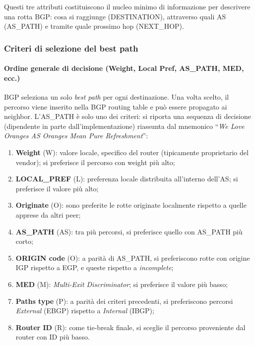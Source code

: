 Questi tre attributi costituiscono il nucleo minimo di informazione per descrivere una rotta BGP: cosa si raggiunge (DESTINATION), attraverso quali AS (AS\_PATH) e tramite quale prossimo hop (NEXT\_HOP).

\subsubsection{Criteri di selezione del best path}

\paragraph{Ordine generale di decisione (Weight, Local Pref, AS\_PATH, MED, ecc.)}

BGP seleziona un solo \emph{best path} per ogni destinazione. Una volta scelto, il percorso viene inserito nella BGP routing table e può essere propagato ai neighbor. L’AS\_PATH è solo uno dei criteri: si riporta una sequenza di decisione (dipendente in parte dall’implementazione) riassunta dal mnemonico “\emph{We Love Oranges AS Oranges Mean Pure Refreshment}”:
\begin{enumerate}
    \item \textbf{Weight} (W): valore locale, specifico del router (tipicamente proprietario del vendor); si preferisce il percorso con weight più alto;
    \item \textbf{LOCAL\_PREF} (L): preferenza locale distribuita all’interno dell’AS; si preferisce il valore più alto;
    \item \textbf{Originate} (O): sono preferite le rotte originate localmente rispetto a quelle apprese da altri peer;
    \item \textbf{AS\_PATH} (AS): tra più percorsi, si preferisce quello con AS\_PATH più corto;
    \item \textbf{ORIGIN code} (O): a parità di AS\_PATH, si preferiscono rotte con origine IGP rispetto a EGP, e queste rispetto a \emph{incomplete};
    \item \textbf{MED} (M): \emph{Multi-Exit Discriminator}; si preferisce il valore più basso;
    \item \textbf{Paths type} (P): a parità dei criteri precedenti, si preferiscono percorsi \emph{External} (EBGP) rispetto a \emph{Internal} (IBGP);
    \item \textbf{Router ID} (R): come tie-break finale, si sceglie il percorso proveniente dal router con ID più basso.
\end{enumerate}

